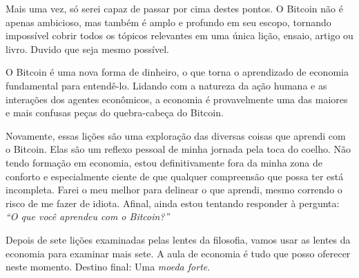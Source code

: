 Mais uma vez, só serei capaz de passar por cima destes pontos. O Bitcoin não é apenas ambicioso, mas também é amplo e profundo em seu escopo, tornando impossível cobrir todos os tópicos relevantes em uma única lição, ensaio, artigo ou livro. Duvido que seja mesmo possível.

O Bitcoin é uma nova forma de dinheiro, o que torna o aprendizado de economia fundamental para entendê-lo. Lidando com a natureza da ação humana e as interações dos agentes econômicos, a economia é provavelmente uma das maiores e mais confusas peças do quebra-cabeça do Bitcoin.

Novamente, essas lições são uma exploração das diversas coisas que aprendi com o Bitcoin. Elas são um reflexo pessoal de minha jornada pela toca do coelho. Não tendo formação em economia, estou definitivamente fora da minha zona de conforto e especialmente ciente de que qualquer compreensão que possa ter está incompleta. Farei o meu melhor para delinear o que aprendi, mesmo correndo o risco de me fazer de idiota. Afinal, ainda estou tentando responder à pergunta: \textit{\enquote{O que você aprendeu com o Bitcoin?}}

Depois de sete lições examinadas pelas lentes da filosofia, vamos usar as lentes da economia para examinar mais sete. A aula de economia é tudo que posso oferecer neste momento. Destino final: Uma \textit{moeda forte}.

